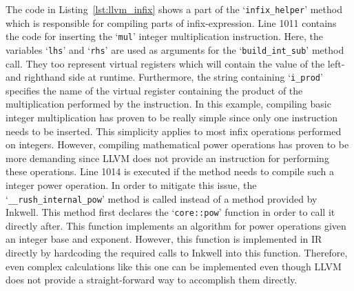 

The code in Listing~\ref{lst:llvm_infix} shows a part of the `\Verb|infix_helper|' method which is responsible for compiling parts of infix-expression.
Line 1011 contains the code for inserting the `\texttt{mul}' integer multiplication instruction.
Here, the variables `\texttt{lhs}' and `\texttt{rhs}' are used as arguments for the `\Verb|build_int_sub|' method call.
They too represent virtual registers which will contain the value of the left- and righthand side at runtime.
Furthermore, the string containing `\Verb|i_prod|' specifies the name of the virtual register containing the product of the multiplication performed by the instruction.
In this example, compiling basic integer multiplication has proven to be really simple since only one instruction needs to be inserted.
This simplicity applies to most infix operations performed on integers.
However, compiling mathematical power operations has proven to be more demanding since LLVM does not provide an instruction for performing these operations.
Line 1014 is executed if the method needs to compile such a integer power operation.
In order to mitigate this issue, the `\Verb|__rush_internal_pow|' method is called instead of a method provided by Inkwell.
This method first declares the `\Verb|core::pow|' function in order to call it directly after.
This function implements an algorithm for power operations given an integer base and exponent.
However, this function is implemented in IR directly by hardcoding the required calls to Inkwell into this function.
Therefore, even complex calculations like this one can be implemented even though LLVM does not provide a straight-forward way to accomplish them directly.


